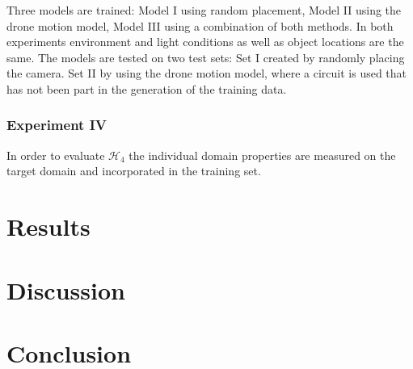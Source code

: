 Three models are trained: Model I using random placement, Model II using the drone motion model, Model III using a combination of both methods. In both experiments environment and light conditions as well as object locations are the same. The models are tested on two test sets: Set I created by randomly placing the camera. Set II by using the drone motion model, where a circuit is used that has not been part in the generation of the training data.


\subsubsection{Experiment IV}

In order to evaluate $\mathcal{H}_4$ the individual domain properties are measured on the target domain and incorporated in the training set.


\section{Results}
\label{sec:training:results}

\section{Discussion}
\label{sec:training:discussion}

\section{Conclusion}
\label{sec:training:conclusion}
